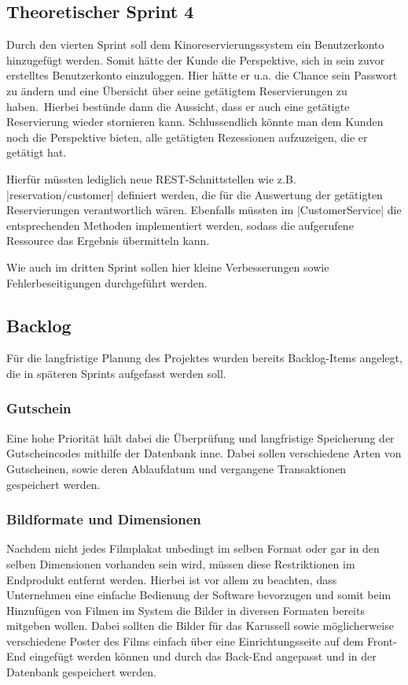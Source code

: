 \subsection{Theoretischer Sprint 4}
\label{ssssec:sprint_benuterkonto}
\authorsection{\authorSG}
Durch den vierten Sprint soll dem Kinoreservierungssystem ein Benutzerkonto hinzugefügt werden.
Somit hätte der Kunde die Perspektive, sich in sein zuvor erstelltes Benutzerkonto einzuloggen.
Hier hätte er u.a. die Chance sein Passwort zu ändern und eine Übersicht über seine getätigtem Reservierungen zu haben.\
Hierbei bestünde dann die Aussicht, dass er auch eine getätigte Reservierung wieder stornieren kann.
Schlussendlich könnte man dem Kunden noch die Perspektive bieten, alle getätigten Rezessionen aufzuzeigen, die er getätigt hat.

Hierfür müssten lediglich neue \acs{REST}-Schnittstellen wie z.B. \jinline|reservation/customer| definiert werden, die für die Auswertung der getätigten Reservierungen verantwortlich wären.
Ebenfalls müssten im \jinline|CustomerService| die entsprechenden Methoden implementiert werden, sodass die aufgerufene Ressource das Ergebnis übermitteln kann.

Wie auch im dritten Sprint sollen hier kleine Verbesserungen sowie Fehlerbeseitigungen durchgeführt werden.

\subsection{Backlog}
\label{ssec:backlog}
\multipleauthorsection{\authorRF}{\authorEJ}
Für die langfristige Planung des Projektes wurden bereits Backlog-Items angelegt, die in späteren Sprints aufgefasst werden soll.

\subsubsection*{Gutschein}
\label{ssssec:gutschein}
Eine hohe Priorität hält dabei die Überprüfung und langfristige Speicherung der Gutscheincodes mithilfe der Datenbank inne.
Dabei sollen verschiedene Arten von Gutscheinen, sowie deren Ablaufdatum und vergangene Transaktionen gespeichert werden.

\subsubsection*{Bildformate und Dimensionen}
\label{ssssec:bildformatedimensionen}
Nachdem nicht jedes Filmplakat unbedingt im selben Format oder gar in den selben Dimensionen vorhanden sein wird, müssen diese Restriktionen im Endprodukt entfernt werden.
Hierbei ist vor allem zu beachten, dass Unternehmen eine einfache Bedienung der Software bevorzugen und somit beim Hinzufügen von Filmen im System die Bilder in diversen Formaten bereits mitgeben wollen.
Dabei sollten die Bilder für das Karussell sowie möglicherweise verschiedene Poster des Films einfach über eine Einrichtungsseite auf dem Front-End eingefügt werden können und durch das Back-End angepasst und in der Datenbank gespeichert werden.

